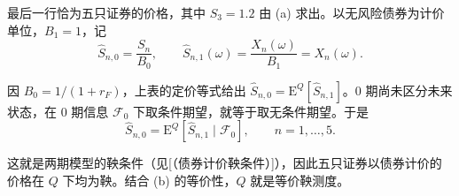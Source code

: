 \begin{solution}[blank-type=manual,blank-vsep=9\baselineskip]
\begin{enumerate}[label=(\alph*)]
    最后一行恰为五只证券的价格，其中 $S_3=1.2$ 由 (a) 求出。以无风险债券为计价单位，$B_1=1$，记
    \[
       \widehat S_{n,0}=\frac{S_n}{B_0},\qquad
       \widehat S_{n,1}(\omega)=\frac{X_n(\omega)}{B_1}=X_n(\omega).
    \]

    因 $B_0=1/(1+r_F)$，上表的定价等式给出 $\widehat S_{n,0}=\mathrm E^Q[\widehat S_{n,1}]$。0 期尚未区分未来状态，在 0 期信息 $\mathcal F_0$ 下取条件期望，就等于取无条件期望。于是
    \[
       \widehat S_{n,0}=\mathrm E^Q[\widehat S_{n,1}\mid\mathcal F_0],
       \qquad n=1,\ldots,5.
    \]

    这就是两期模型的鞅条件\ifdefined\WJHandoutKnowledge（见[（债券计价鞅条件）]）\fi，因此五只证券以债券计价的价格在 $Q$ 下均为鞅。结合 (b) 的等价性，$Q$ 就是等价鞅测度。\qedhere
\end{enumerate}
\end{solution}
